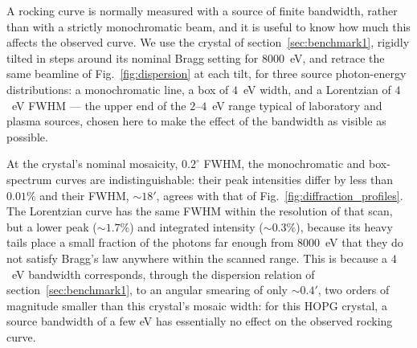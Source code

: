 \documentclass{iucr}
\begin{document}
A rocking curve is normally measured with a source of finite bandwidth, rather
than with a strictly monochromatic beam, and it is useful to know how much this
affects the observed curve. We use the crystal of section~\ref{sec:benchmark1},
rigidly tilted in steps around its nominal Bragg setting for $8000$~eV, and
retrace the same beamline of Fig.~\ref{fig:dispersion} at each tilt, for three
source photon-energy distributions: a monochromatic line, a box of $4$~eV width,
and a Lorentzian of $4$~eV FWHM --- the upper end of the $2$--$4$~eV range
typical of laboratory and plasma sources, chosen here to make the effect of the
bandwidth as visible as possible.

At the crystal's nominal mosaicity, $0.2^\circ$ FWHM, the monochromatic and
box-spectrum curves are indistinguishable: their peak intensities differ by
less than $0.01\%$ and their FWHM, $\sim 18'$, agrees with that of
Fig.~\ref{fig:diffraction_profiles}. The Lorentzian curve has the same FWHM
within the resolution of that scan, but a lower peak ($\sim 1.7\%$) and
integrated intensity ($\sim 0.3\%$), because its heavy tails place a small
fraction of the photons far enough from $8000$~eV that they do not satisfy
Bragg's law anywhere within the scanned range. This is because a $4$~eV
bandwidth corresponds, through the dispersion relation of
section~\ref{sec:benchmark1}, to an angular smearing of only $\sim 0.4'$, two
orders of magnitude smaller than this crystal's mosaic width: for this HOPG
crystal, a source bandwidth of a few eV has essentially no effect on the
observed rocking curve.
\end{document}
